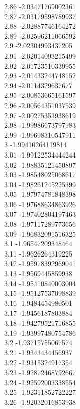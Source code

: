 {2.86	-2.03471769002361\\
2.87	-2.03179598789937\\
2.88	-2.02887746164272\\
2.89	-2.02596211066592\\
2.9	-2.02304993437205\\
2.91	-2.02014093215499\\
2.92	-2.01723510339955\\
2.93	-2.01433244748152\\
2.94	-2.0114329637677\\
2.95	-2.00853665161597\\
2.96	-2.00564351037539\\
2.97	-2.00275353938619\\
2.98	-1.99986673797983\\
2.99	-1.99698310547911\\
3	-1.99410264119814\\
3.01	-1.99122534444244\\
3.02	-1.98835121450897\\
3.03	-1.98548025068617\\
3.04	-1.98261245225399\\
3.05	-1.97974781848398\\
3.06	-1.97688634863926\\
3.07	-1.97402804197463\\
3.08	-1.97117289773656\\
3.09	-1.96832091516325\\
3.1	-1.96547209348464\\
3.11	-1.9626264319225\\
3.12	-1.95978392969041\\
3.13	-1.9569445859938\\
3.14	-1.95410840003004\\
3.15	-1.95127537098839\\
3.16	-1.9484454980501\\
3.17	-1.9456187803884\\
3.18	-1.94279521716855\\
3.19	-1.93997480754786\\
3.2	-1.93715755067574\\
3.21	-1.9343434456937\\
3.22	-1.9315324917354\\
3.23	-1.92872468792667\\
3.24	-1.92592003338554\\
3.25	-1.92311852722227\\
3.26	-1.92032016853938\\
}
